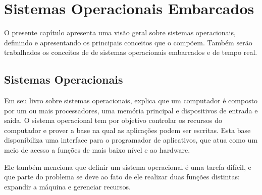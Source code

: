 \chapter{Sistemas Operacionais Embarcados}


O presente capítulo apresenta uma visão geral sobre sistemas operacionais, definindo e apresentando os principais conceitos que o compõem. Também serão trabalhados os conceitos de de sistemas operacionais embarcados e de tempo real.

%
%
%
%

\section{Sistemas Operacionais}

Em seu livro sobre sistemas operacionais,  explica que um computador é composto por um ou mais processadores, uma memória principal e dispositivos de entrada e saída. O sistema operacional tem por objetivo controlar os recursos do computador e prover a base na qual as aplicações podem ser escritas. Esta base disponibiliza uma interface para o programador de aplicativos, que atua como um meio de acesso a funções de mais baixo nível e ao hardware.

Ele também menciona que definir um sistema operacional é uma tarefa difícil, e que parte do problema se deve ao fato de ele realizar duas funções distintas: expandir a máquina e gerenciar recursos.

